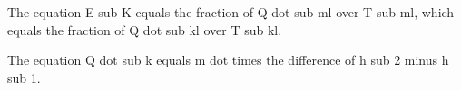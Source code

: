 The equation E sub K equals the fraction of Q dot sub ml over T sub ml, which equals the fraction of Q dot sub kl over T sub kl.

The equation Q dot sub k equals m dot times the difference of h sub 2 minus h sub 1.